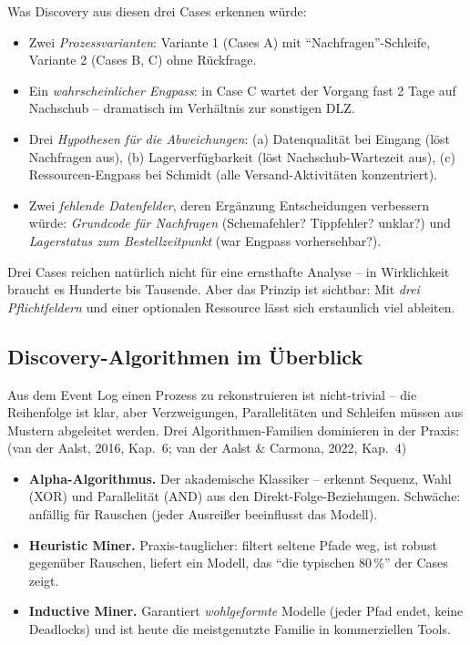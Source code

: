 \documentclass[11pt,a4paper,oneside]{article}
\newcommand{\fachbegriff}[1]{\textbf{#1}}
\newcommand{\quelle}[1]{{\footnotesize\color{lpGray}(#1)}}
\begin{document}
\noindent Was Discovery aus diesen drei Cases erkennen würde:
\begin{itemize}
  \item Zwei \emph{Prozessvarianten}: Variante 1 (Cases A) mit ``Nachfragen''-Schleife, Variante 2 (Cases B, C) ohne Rückfrage.
  \item Ein \emph{wahrscheinlicher Engpass}: in Case C wartet der Vorgang fast 2 Tage auf Nachschub -- dramatisch im Verhältnis zur sonstigen DLZ.
  \item Drei \emph{Hypothesen für die Abweichungen}: (a) Datenqualität bei Eingang (löst Nachfragen aus), (b) Lagerverfügbarkeit (löst Nachschub-Wartezeit aus), (c) Ressourcen-Engpass bei Schmidt (alle Versand-Aktivitäten konzentriert).
  \item Zwei \emph{fehlende Datenfelder}, deren Ergänzung Entscheidungen verbessern würde: \emph{Grundcode für Nachfragen} (Schemafehler? Tippfehler? unklar?) und \emph{Lagerstatus zum Bestellzeitpunkt} (war Engpass vorhersehbar?).
\end{itemize}

Drei Cases reichen natürlich nicht für eine ernsthafte Analyse -- in Wirklichkeit braucht es Hunderte bis Tausende. Aber das Prinzip ist sichtbar: Mit \emph{drei Pflichtfeldern} und einer optionalen Ressource lässt sich erstaunlich viel ableiten.

\subsection{Discovery-Algorithmen im Überblick}

Aus dem Event Log einen Prozess zu rekonstruieren ist nicht-trivial -- die Reihenfolge ist klar, aber Verzweigungen, Parallelitäten und Schleifen müssen aus Mustern abgeleitet werden. Drei Algorithmen-Familien dominieren in der Praxis: \quelle{van der Aalst, 2016, Kap.~6; van der Aalst \& Carmona, 2022, Kap.~4}

\begin{itemize}
  \item \fachbegriff{Alpha-Algorithmus.} Der akademische Klassiker -- erkennt Sequenz, Wahl (XOR) und Parallelität (AND) aus den Direkt-Folge-Beziehungen. Schwäche: anfällig für Rauschen (jeder Ausreißer beeinflusst das Modell).
  \item \fachbegriff{Heuristic Miner.} Praxis-tauglicher: filtert seltene Pfade weg, ist robust gegenüber Rauschen, liefert ein Modell, das ``die typischen 80\,\%'' der Cases zeigt.
  \item \fachbegriff{Inductive Miner.} Garantiert \emph{wohlgeformte} Modelle (jeder Pfad endet, keine Deadlocks) und ist heute die meistgenutzte Familie in kommerziellen Tools.
\end{itemize}
\end{document}
